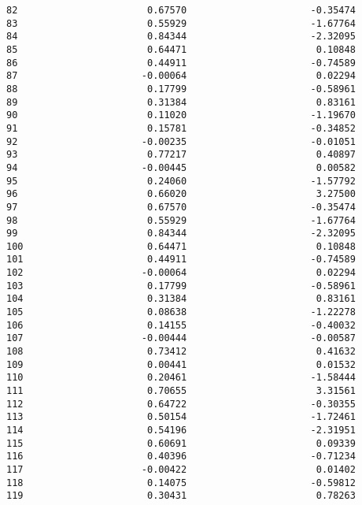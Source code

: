 \documentclass[11pt]{article}
\begin{document}
\begin{tcolorbox}[breakable, size=fbox, boxrule=.5pt, pad at break*=1mm, opacityfill=0]
\begin{Verbatim}[commandchars=\\\{\}]
82                       0.67570                      -0.35474
83                       0.55929                      -1.67764
84                       0.84344                      -2.32095
85                       0.64471                       0.10848
86                       0.44911                      -0.74589
87                      -0.00064                       0.02294
88                       0.17799                      -0.58961
89                       0.31384                       0.83161
90                       0.11020                      -1.19670
91                       0.15781                      -0.34852
92                      -0.00235                      -0.01051
93                       0.77217                       0.40897
94                      -0.00445                       0.00582
95                       0.24060                      -1.57792
96                       0.66020                       3.27500
97                       0.67570                      -0.35474
98                       0.55929                      -1.67764
99                       0.84344                      -2.32095
100                      0.64471                       0.10848
101                      0.44911                      -0.74589
102                     -0.00064                       0.02294
103                      0.17799                      -0.58961
104                      0.31384                       0.83161
105                      0.08638                      -1.22278
106                      0.14155                      -0.40032
107                     -0.00444                      -0.00587
108                      0.73412                       0.41632
109                      0.00441                       0.01532
110                      0.20461                      -1.58444
111                      0.70655                       3.31561
112                      0.64722                      -0.30355
113                      0.50154                      -1.72461
114                      0.54196                      -2.31951
115                      0.60691                       0.09339
116                      0.40396                      -0.71234
117                     -0.00422                       0.01402
118                      0.14075                      -0.59812
119                      0.30431                       0.78263


\end{Verbatim}
\end{tcolorbox}
\end{document}
